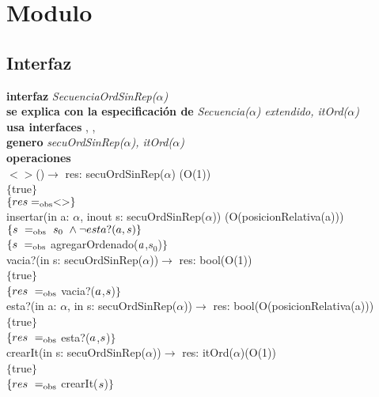 \section*{Modulo }

\subsection*{Interfaz}
\textbf{interfaz} \textit{SecuenciaOrdSinRep($\alpha$)}\\
\textbf{se explica con la especificaci\'on de} \textit{Secuencia($\alpha$) extendido, itOrd($\alpha$)}\\
\textbf{usa interfaces} , \nombretad{$\alpha$}, \\
\textbf{genero} \textit{secuOrdSinRep($\alpha$), itOrd($\alpha$)}\\

\textbf{operaciones}\\

$<>$()$\longrightarrow$ res: secuOrdSinRep($\alpha$) \hfill (O(1))\\
$\{$true$\}$\\
$\{{res} =_{\mathrm{obs}} <> \}$\\

insertar(in a: $\alpha$, inout s: secuOrdSinRep($\alpha$)) \hfill (O(posicionRelativa(a)))\\
$\{{s}\ =_{\mathrm{obs}}\ s_0\ \wedge \neg esta?(a,s) \}$\\
$\{{s}\ =_{\mathrm{obs}}$ agregarOrdenado(${a}$,$s_0$)$\}$\\

vacia?(in s: secuOrdSinRep($\alpha$))$\longrightarrow$ res: bool\hfill (O(1))\\
$\{$true$\}$\\
$\{{res}\ =_{\mathrm{obs}}$ vacia?(${a}$,${s}$)$\}$\\

esta?(in a: $\alpha$, in s: secuOrdSinRep($\alpha$))$\longrightarrow$ res: bool\hfill (O(posicionRelativa(a)))\\
$\{$true$\}$\\
$\{{res}\ =_{\mathrm{obs}}$ esta?(${a}$,${s}$)$\}$\\

crearIt(in s: secuOrdSinRep($\alpha$))$\longrightarrow$ res: itOrd($\alpha$)\hfill (O(1))\\
$\{$true$\}$\\
$\{{res}\ =_{\mathrm{obs}}$ crearIt(${s}$)$\}$\\

